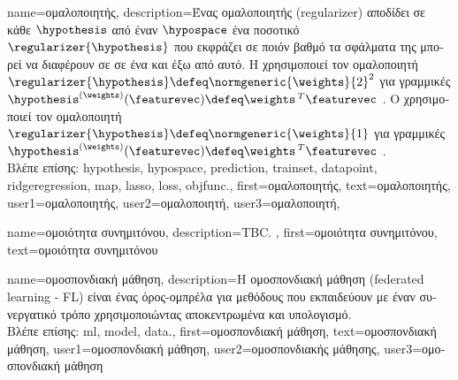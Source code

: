 {name={\foreignlanguage{greek}{ομαλοποιητής}}, 
	description={\foreignlanguage{greek}{Ένας ομαλοποιητής} (regularizer) 
		\foreignlanguage{greek}{αποδίδει σε κάθε}  $\hypothesis$ \foreignlanguage{greek}{από έναν} 
		 $\hypospace$ 	\foreignlanguage{greek}{ένα ποσοτικό}  
		$\regularizer{\hypothesis}$ \foreignlanguage{greek}{που εκφράζει σε ποιόν βαθμό τα σφάλματα} 
		 \foreignlanguage{greek}{της μπορεί να διαφέρουν σε}  
		\foreignlanguage{greek}{σε ένα}  \foreignlanguage{greek}{και έξω από αυτό. Η} 
		 \foreignlanguage{greek}{χρησιμοποιεί τον ομαλοποιητή 
		$\regularizer{\hypothesis} \defeq \normgeneric{\weights}{2}^{2}$ για γραμμικές}   
		$\hypothesis^{(\weights)}(\featurevec) \defeq \weights\,^{T} \featurevec$ \cite[\foreignlanguage{greek}{Κεφ.} 3]{MLBasics}. 
		\foreignlanguage{greek}{Ο}  \foreignlanguage{greek}{χρησιμο\-ποι\-εί τον ομαλοποιητή 
		$\regularizer{\hypothesis} \defeq \normgeneric{\weights}{1}$ για γραμμικές}   
		$\hypothesis^{(\weights)}(\featurevec) \defeq \weights\,^{T} \featurevec$ \cite[\foreignlanguage{greek}{Κεφ.} 3]{MLBasics}.
		\\
		\foreignlanguage{greek}{Βλέπε επίσης:} \gls{hypothesis}, \gls{hypospace}, \gls{prediction}, \gls{trainset}, \gls{datapoint}, 
		\gls{ridgeregression}, \gls{map}, \gls{lasso}, \gls{loss}, \gls{objfunc}.},
	first={\foreignlanguage{greek}{ομαλοποιητής}},
	text={\foreignlanguage{greek}{ομαλοποιητής}},
	user1={\foreignlanguage{greek}{ομαλοποιητής}}, %
 	user2={\foreignlanguage{greek}{ομαλοποιητή}}, %
 	user3={\foreignlanguage{greek}{ομαλοποιητή}}, %
}

{name={\foreignlanguage{greek}{ομοιότητα συνημιτόνου}},
	description={TBC. },
	first={\foreignlanguage{greek}{ομοιότητα συνημιτόνου}},
	text={\foreignlanguage{greek}{ομοιότητα συνημιτόνου}}
}

{name={\foreignlanguage{greek}{ομοσπονδιακή μάθηση}}, 
	description={\foreignlanguage{greek}{Η ομοσπονδιακή μάθηση} 
		(federated learning - FL) \foreignlanguage{greek}{είναι ένας όρος-ομπρέλα για μεθόδους}  
		\foreignlanguage{greek}{που εκπαι\-δεύ\-ουν}  \foreignlanguage{greek}{με έναν συνεργατικό
		τρόπο χρησιμοποιώντας αποκεντρωμένα}  \foreignlanguage{greek}{και υπολογισμό}.
		\\
		\foreignlanguage{greek}{Βλέπε επίσης:} \gls{ml}, \gls{model}, \gls{data}.},
	first={\foreignlanguage{greek}{ομοσπονδιακή μάθηση}},
	text={\foreignlanguage{greek}{ομοσπονδιακή μάθηση}}, 
	user1={\foreignlanguage{greek}{ομοσπονδιακή μάθηση}}, %
  	user2={\foreignlanguage{greek}{ομοσπονδιακής μάθησης}}, %
	user3={\foreignlanguage{greek}{ομοσπονδιακή μάθηση}} %
}


